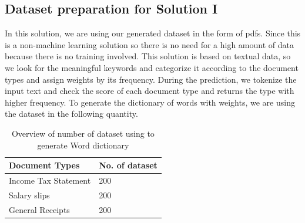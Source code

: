\subsection{Dataset preparation for Solution I}
In this solution, we are using our generated dataset in the form of pdfs. Since this is a non-machine learning solution so there is no need for a high amount of data because there is no training involved. This solution is based on textual data, so we look for the meaningful keywords and categorize it according to the document types and assign weights by its frequency. During the prediction, we tokenize the input text and check the score of each document type and returns the type with higher frequency. To generate the dictionary of words with weights, we are using the dataset in the following quantity.
\begin{table}[H]
\centering
\begin{tabular}{l | l }
Document Types & No. of dataset\\
\hline
Income Tax Statement & 200 \\
Salary slips & 200 \\
General Receipts & 200
\end{tabular}
\caption{Overview of number of dataset using to generate Word dictionary}
\label{dataset_count_sol1}
\end{table}

